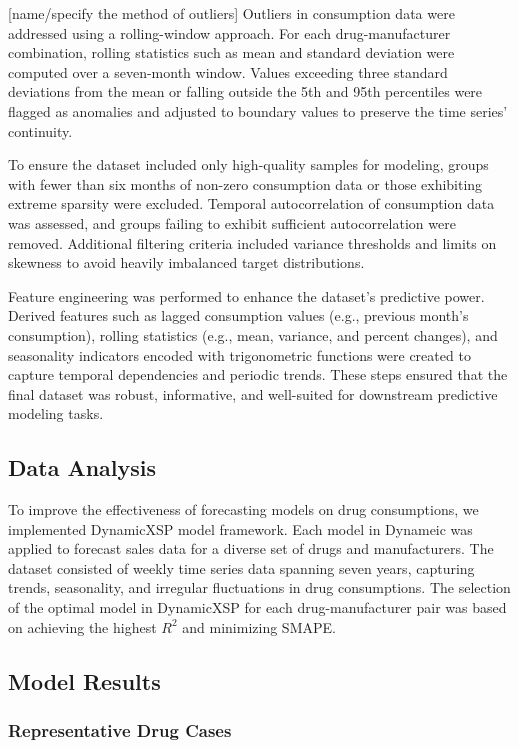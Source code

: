 \documentclass[journal]{IEEEtran}
\begin{document}
[name/specify the method of outliers] Outliers in consumption data were addressed using a rolling-window approach. For each drug-manufacturer combination, rolling statistics such as mean and standard deviation were computed over a seven-month window. Values exceeding three standard deviations from the mean or falling outside the 5th and 95th percentiles were flagged as anomalies and adjusted to boundary values to preserve the time series' continuity.

To ensure the dataset included only high-quality samples for modeling, groups with fewer than six months of non-zero consumption data or those exhibiting extreme sparsity were excluded. Temporal autocorrelation of consumption data was assessed, and groups failing to exhibit sufficient autocorrelation were removed. Additional filtering criteria included variance thresholds and limits on skewness to avoid heavily imbalanced target distributions.

Feature engineering was performed to enhance the dataset's predictive power. Derived features such as lagged consumption values (e.g., previous month’s consumption), rolling statistics (e.g., mean, variance, and percent changes), and seasonality indicators encoded with trigonometric functions were created to capture temporal dependencies and periodic trends. These steps ensured that the final dataset was robust, informative, and well-suited for downstream predictive modeling tasks.

\subsection{Data Analysis}

To improve the effectiveness of forecasting models on drug consumptions, we implemented DynamicXSP model framework. Each model in Dynameic was applied to forecast sales data for a diverse set of drugs and manufacturers. The dataset consisted of weekly time series data spanning seven years, capturing trends, seasonality, and irregular fluctuations in drug consumptions. The selection of the optimal model in DynamicXSP for each drug-manufacturer pair was based on achieving the highest $R^2$ and minimizing SMAPE. 

\subsection{Model Results}
\subsubsection{Representative Drug Cases}
\end{document}
